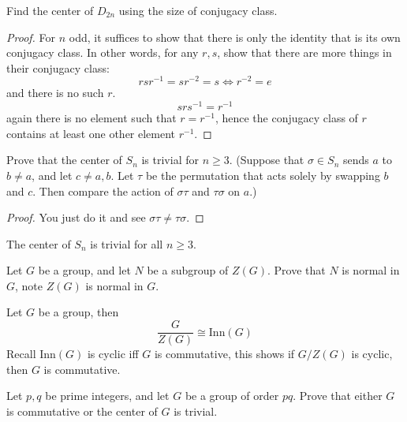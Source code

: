 \documentclass[openany]{book}
\begin{document}
\begin{prob}
Find the center of $D_{2n}$ using the size of conjugacy class.
\end{prob}
\begin{proof}
    For $n$ odd, it suffices to show that there is only the identity that is its own conjugacy class. In other words, for any $r,s$, show that there are more things in their conjugacy class: 
    \begin{equation*}
        rsr^{-1}=sr^{-2}=s \iff r^{-2}=e
    \end{equation*}
    and there is no such $r$. 
    \begin{equation*}
        srs^{-1}=r^{-1}
    \end{equation*}
    again there is no element such that $r=r^{-1}$, hence the conjugacy class of $r$ contains at least one other element $r^{-1}$.
\end{proof}

\begin{prob}
Prove that the center of $S_n$ is trivial for $n \geq 3$. (Suppose that $\sigma \in S_n$ sends $a$ to $b \neq a$, and let $c \neq a, b$. Let $\tau$ be the permutation that acts solely by swapping $b$ and $c$. Then compare the action of $\sigma \tau$ and $\tau \sigma$ on $a$.)
\end{prob}
\begin{proof}
    You just do it and see $\sigma\tau\neq\tau\sigma$.
\end{proof}

\begin{prop}
    The center of $S_n$ is trivial for all $n\geq 3$.
\end{prop}

\begin{prop}
Let $G$ be a group, and let $N$ be a subgroup of $Z(G)$. Prove that $N$ is normal in $G$, note $Z(G)$ is normal in $G$.
\end{prop}

\begin{prop}
    Let $G$ be a group, then 
    \begin{equation*}
        \frac{G}{Z(G)}\cong\text{Inn}(G)
    \end{equation*}
    Recall $\text{Inn}(G)$ is cyclic iff $G$ is commutative, this shows if $G/Z(G)$ is cyclic, then $G$ is commutative.
\end{prop}




\begin{prop}
    Let $p, q$ be prime integers, and let $G$ be a group of order $pq$. Prove that either $G$ is commutative or the center of $G$ is trivial.
\end{prop}
\end{document}
